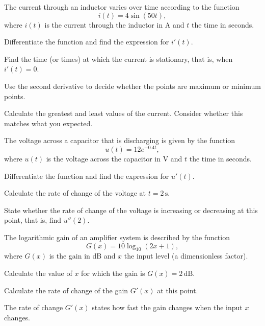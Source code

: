 
The current through an inductor varies over time according to the function
\[
  i(t) = 4\sin(50t),
\]
where $i(t)$ is the current through the inductor in A and $t$ the time in seconds.
\begin{parts}
  \item Differentiate the function and find the expression for $i'(t)$.
  \item Find the time (or times) at which the current is stationary, that is, when
    $i'(t) = 0$.
  \item Use the second derivative to decide whether the points are maximum or minimum points.
  \item Calculate the greatest and least values of the current. Consider whether this matches
    what you expected.
\end{parts}

The voltage across a capacitor that is discharging is given by the function
\[
  u(t) = 12e^{-0.4t},
\]
where $u(t)$ is the voltage across the capacitor in V and $t$ the time in seconds.
\begin{parts}
  \item Differentiate the function and find the expression for $u'(t)$.
  \item Calculate the rate of change of the voltage at $t = 2\,\text{s}$.
  \item State whether the rate of change of the voltage is increasing or decreasing at this
    point, that is, find $u''(2)$.
\end{parts}

The logarithmic gain of an amplifier system is described by the function
\[
  G(x) = 10\log_{10}(2x + 1),
\]
where $G(x)$ is the gain in dB and $x$ the input level (a dimensionless factor).
\begin{parts}
  \item Calculate the value of $x$ for which the gain is $G(x) = 2\,\text{dB}$.
  \item Calculate the rate of change of the gain $G'(x)$ at this point.
\end{parts}

\begin{aside}
\note[Note] The rate of change $G'(x)$ states how fast the gain changes when the input $x$
changes.
\end{aside}

